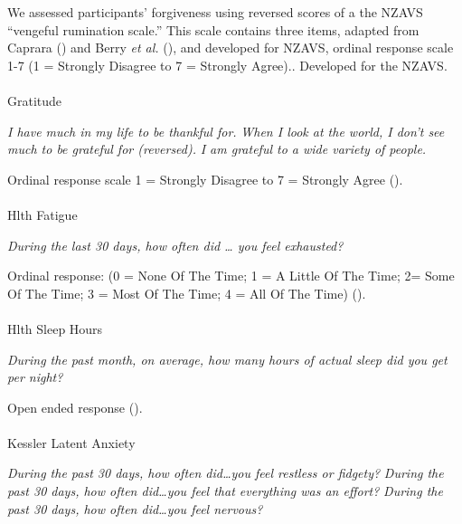 \documentclass[
  single column]{article}
\makeatletter
\let\oldparagraph\paragraph
\renewcommand{\paragraph}{
    \@ifstar
      \xxxParagraphStar
      \xxxParagraphNoStar
  }
\newcommand{\xxxParagraphStar}[1]{\oldparagraph*{#1}\mbox{}}
\newcommand{\xxxParagraphNoStar}[1]{\oldparagraph{#1}\mbox{}}
\makeatother
\begin{document}
We assessed participants' forgiveness using reversed scores of a the
NZAVS ``vengeful rumination scale.'' This scale contains three items,
adapted from Caprara () and
Berry \emph{et al.} (), and
developed for NZAVS, ordinal response scale 1-7 (1 = Strongly Disagree
to 7 = Strongly Agree).. Developed for the NZAVS.

\paragraph{Gratitude}\label{gratitude}

\emph{I have much in my life to be thankful for.} \emph{When I look at
the world, I don't see much to be grateful for (reversed).} \emph{I am
grateful to a wide variety of people.}

Ordinal response scale 1 = Strongly Disagree to 7 = Strongly Agree
().

\paragraph{Hlth Fatigue}\label{hlth-fatigue}

\emph{During the last 30 days, how often did \ldots{} you feel
exhausted?}

Ordinal response: (0 = None Of The Time; 1 = A Little Of The Time; 2=
Some Of The Time; 3 = Most Of The Time; 4 = All Of The Time)
().

\paragraph{Hlth Sleep Hours}\label{hlth-sleep-hours}

\emph{During the past month, on average, how many hours of actual sleep
did you get per night?}

Open ended response ().

\paragraph{Kessler Latent Anxiety}\label{kessler-latent-anxiety}

\emph{During the past 30 days, how often did\ldots you feel restless or
fidgety?} \emph{During the past 30 days, how often did\ldots you feel
that everything was an effort?} \emph{During the past 30 days, how often
did\ldots you feel nervous?}
\end{document}
